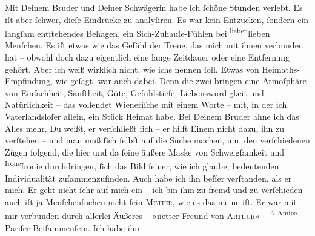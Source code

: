\pstart
           Mit Deinem Bruder und Deiner
                  Schwägerin habe ich
               ſchöne Stunden verlebt. Es iſt aber ſchwer, dieſe Eindrücke zu analyſiren. Es war
               kein Entzücken, ſondern ein langſam entſtehendes Behagen, ein Sich-Zuhauſe-Fühlen bei \substVorne{}\textsuperscript{lieben}\substDazwischen{}lieben\substHinten{} Menſchen. Es iſt etwas wie das Gefühl der Treue, das mich mit ihnen
               verbunden hat – obwohl doch dazu eigentlich eine lange Zeitdauer oder eine Entfernung
               gehört. Aber ich weiß wirklich nicht, wie ichs nennen ſoll. Etwas von
               Heimaths-Empfindung, wie geſagt, {\pb}war auch dabei.
               Denn die zwei bringen eine Atmoſphäre von Einfachheit, Sanftheit, Güte, Gefühlstiefe,
               Liebenswürdigkeit und Natürlichkeit – das vollendet Wieneriſche mit einem Worte – mit, in der ich Vaterlandsloſer allein, \strikeout{\textcolor{gray}{man}} ein Stück Heimat habe. Bei Deinem Bruder ahne ich das Alles mehr. Du weißt, er verſchließt
               ſich – er hilft Einem nicht dazu, ihn zu verſtehen – und man muß ſich ſelbſt auf die
               Suche machen, um, den verſchiedenen Zügen folgend, die hier und da ſeine äußere Maske
               von Schweigſamkeit und \substVorne{}\textsuperscript{Irone}\substDazwischen{}Ironie\substHinten{} durchdringen, ſich {\pb}das Bild ſeiner, wie
               ich glaube, bedeutenden Individualität zuſammenzufinden. Auch habe ich ihn beſſer
               verſtanden, als er mich. Er geht nicht ſehr auf mich ein – ich bin ihm zu fremd und
               zu verſchieden – auch iſt ja Menſchenſuchen nicht ſein \textsc{Metier}, wie es das meine iſt. Er war mit mir verbunden durch allerlei
               Äußeres – »netter Freund von \textsc{Arthur}« – \substVorne{}\textsuperscript{\textcolor{gray}{A} Amſee}\substDazwischen{}\textsc{\label{K_L02608-1v}\label{K_L02608-1}}\substHinten{} – Pariſer Beiſammenſein. Ich habe ihn
